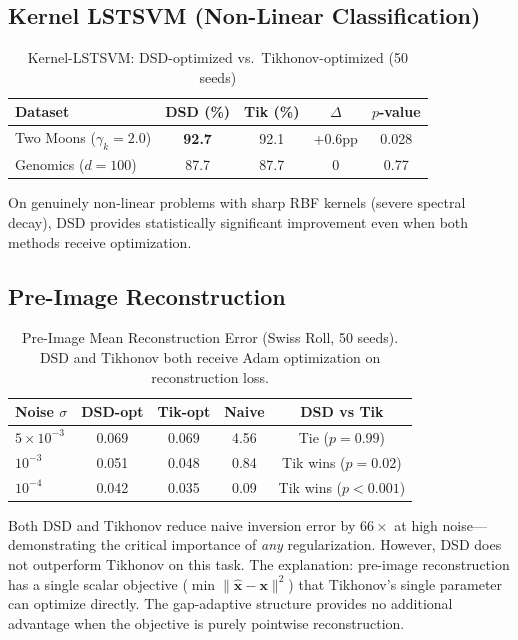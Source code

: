 \documentclass[preprint,review,12pt]{elsarticle}
\begin{document}
\subsection{Kernel LSTSVM (Non-Linear Classification)}

\begin{table}[!t]
\centering
\caption{Kernel-LSTSVM: DSD-optimized vs.\ Tikhonov-optimized (50 seeds)}
\label{tab:kernel_lstsvm_results}
\begin{tabular}{@{}lcccc@{}}
\toprule
\textbf{Dataset} & \textbf{DSD (\%)} & \textbf{Tik (\%)} & \textbf{$\Delta$} & \textbf{$p$-value} \\
\midrule
Two Moons ($\gamma_k{=}2.0$) & \textbf{92.7} & 92.1 & +0.6pp & 0.028 \\
Genomics ($d{=}100$) & 87.7 & 87.7 & 0 & 0.77 \\
\bottomrule
\end{tabular}
\end{table}

On genuinely non-linear problems with sharp RBF kernels (severe spectral decay), DSD provides statistically significant improvement even when both methods receive optimization.

\subsection{Pre-Image Reconstruction}

\begin{table}[!t]
\centering
\caption{Pre-Image Mean Reconstruction Error (Swiss Roll, 50 seeds). DSD and Tikhonov both receive Adam optimization on reconstruction loss.}
\label{tab:preimage_results}
\begin{tabular}{@{}lcccc@{}}
\toprule
\textbf{Noise $\sigma$} & \textbf{DSD-opt} & \textbf{Tik-opt} & \textbf{Naive} & \textbf{DSD vs Tik} \\
\midrule
$5{\times}10^{-3}$ & 0.069 & 0.069 & 4.56 & Tie ($p{=}0.99$) \\
$10^{-3}$ & 0.051 & 0.048 & 0.84 & Tik wins ($p{=}0.02$) \\
$10^{-4}$ & 0.042 & 0.035 & 0.09 & Tik wins ($p{<}0.001$) \\
\bottomrule
\end{tabular}
\end{table}

Both DSD and Tikhonov reduce naive inversion error by $66\times$ at high noise---demonstrating the critical importance of \emph{any} regularization. However, DSD does not outperform Tikhonov on this task. The explanation: pre-image reconstruction has a single scalar objective ($\min\|\hat{\bm{x}} - \bm{x}\|^2$) that Tikhonov's single parameter can optimize directly. The gap-adaptive structure provides no additional advantage when the objective is purely pointwise reconstruction.
\end{document}

